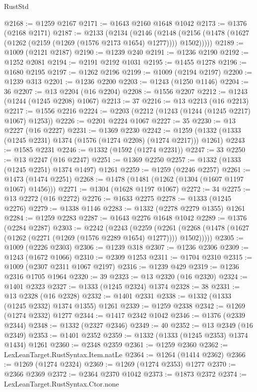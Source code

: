 \begin{lexlean}{RustStd}
\begin{coremodule}
@2168 := @1259 @2167
@2171 := @1643 @2160 @1648 @1042
@2173 := @1376 (@2168 @2171)
@2187 := @2133
    (@2134
      (@2146
        (@2148 (@2156 (@1478 (@1627 (@1262 (@2159 (@1269 (@1576 @2173 @1654) @1277)))) @1502)))))
@2189 := @1009 (@2121 @2187)
@2190 := @1239 @240
@2191 := @1236 @2190
@2192 := @1252 @2081
@2194 := @2191 @2192 @1031
@2195 := @1455 @1278
@2196 := @1680 @2195
@2197 := @1262 @2196
@2199 := @1009 (@2194 @2197)
@2200 := @1239 @313
@2201 := @1236 @2200
@2203 := @1243 (@1250 @1146)
@2204 := 36
@2207 := @13 @2204 (@16 @2204)
@2208 := @1556 @2207
@2212 := @1243 (@1244 (@1245 @2208) @1067)
@2213 := 37
@2216 := @13 @2213 (@16 @2213)
@2217 := @1556 @2216
@2224 := @2203 (@2212 (@1243 (@1244 (@1245 @2217) @1067) @1253))
@2226 := @2201 @2224 @1067
@2227 := 35
@2230 := @13 @2227 (@16 @2227)
@2231 := @1369 @2230
@2242 := @1259 (@1332 (@1333 (@1245 @2231) @1374 (@1576 (@1274 @2208) (@1274 @2217))) @1261)
@2243 := @1585 @2231
@2246 := @1332 (@1592 (@1274 @2231))
@2247 := 33
@2250 := @13 @2247 (@16 @2247)
@2251 := @1369 @2250
@2257 := @1332 (@1333 (@1245 @2251) @1374 @1497) @1261
@2259 := @1259 (@2246 @2257)
@2261 := @1473 (@1474 @2251)
@2268 := @1478 (@1481 (@1262 (@1304 (@1607 @1197 @1067) @1456)))
@2271 := @1304 (@1628 @1197 @1067)
@2272 := 34
@2275 := @13 @2272 (@16 @2272)
@2276 := @1633 @2275
@2278 := @1333 (@1245 @2276)
@2279 := @1338 @1146
@2283 := @1332 (@2278 @2279 @1355) @1261
@2284 := @1259 @2283
@2287 := @1643 @2276 @1648 @1042
@2289 := @1376 (@2284 @2287)
@2303 := @2242
    (@2243
      (@2259
        (@2261 (@2268 (@1478 (@1627 (@1262 (@2271 (@1269 (@1576 @2289 @1654) @1277)))) @1502)))))
@2305 := @1009 (@2226 @2303)
@2306 := @1239 @318
@2307 := @1236 @2306
@2309 := @1243 (@1672 @1066)
@2310 := @2309 @1253
@2311 := @1704 @2310
@2315 := @1009 (@2307 @2311 @1067 @2197)
@2316 := @1239 @429
@2319 := @1236 @2316 @1705 @1964
@2320 := 39
@2323 := @13 @2320 (@16 @2320)
@2324 := @1401 @2323
@2327 := @1333 (@1245 @2324) @1374
@2328 := 38
@2331 := @13 @2328 (@16 @2328)
@2332 := @1401 @2331
@2338 := @1332 (@1333 (@1245 @2332) @1374 @1355) @1261
@2339 := @1259 @2338
@2342 := @1269 (@1274 @2332) @1277
@2344 := @1417 @2342 @1042
@2346 := @1376 (@2339 @2344)
@2348 := @1332 (@2327 @2346)
@2349 := 40
@2352 := @13 @2349 (@16 @2349)
@2353 := @1401 @2352
@2359 := @1332 (@1333 (@1245 @2353) @1374 @1434) @1261
@2360 := @2348 @2359
@2361 := @1259 @2360
@2362 := LexLeanTarget.RustSyntax.Item.natLe
@2364 := @1264 (@1414 @2362)
@2366 := @1269 (@1274 @2324)
@2369 := @1269 (@1274 @2353) @1277
@2370 := @2366 @2369
@2372 := @2364 @2370 @1042
@2373 := @1873 @2372
@2374 := LexLeanTarget.RustSyntax.Ctor.none

\end{coremodule}
\end{lexlean}
